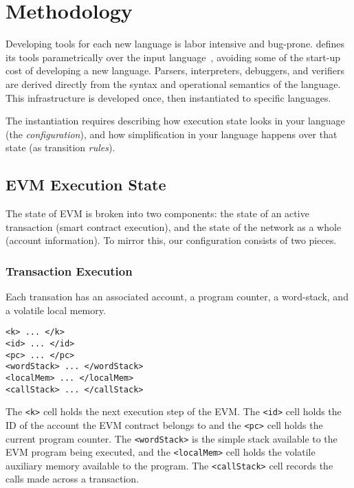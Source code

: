 \section{Methodology}

Developing tools for each new language is labor intensive and bug-prone. \K
defines its tools parametrically over the input
language~\cite{stefanescu-park-yuwen-li-rosu-2016-oopsla}, avoiding some of the
start-up cost of developing a new language. Parsers, interpreters, debuggers,
and verifiers are derived directly from the syntax and operational semantics of
the language. This infrastructure is developed once, then instantiated to
specific languages.

The instantiation requires describing how execution state looks in your language
(the \textit{configuration}), and how simplification in your language happens
over that state (as transition \textit{rules}).

\subsection{EVM Execution State}

The state of EVM is broken into two components: the state of an active
transaction (smart contract execution), and the state of the network as a whole
(account information). To mirror this, our configuration consists of two pieces.

\subsubsection{Transaction Execution}

Each transation has an associated account, a program counter, a word-stack, and
a volatile local memory.

\begin{verbatim}
<k> ... </k>
<id> ... </id>
<pc> ... </pc>
<wordStack> ... </wordStack>
<localMem> ... </localMem>
<callStack> ... </callStack>
\end{verbatim}

The \texttt{<k>} cell holds the next execution step of the EVM.  The
\texttt{<id>} cell holds the ID of the account the EVM contract belongs to and
the \texttt{<pc>} cell holds the current program counter. The
\texttt{<wordStack>} is the simple stack available to the EVM program being
executed, and the \texttt{<localMem>} cell holds the volatile auxiliary memory
available to the program. The \texttt{<callStack>} cell records the calls made
across a transaction.

